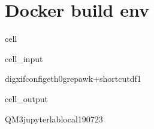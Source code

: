 \documentclass[letterpaper,table,10pt,english]{jupyterBook}
\begin{document}
\section{Docker build env}
\label{\detokenize{tests/build_versions_checks:docker-build-env}}
\begin{sphinxuseclass}{cell}\begin{sphinxVerbatimInput}

\begin{sphinxuseclass}{cell_input}
\begin{sphinxVerbatim}[commandchars=\\\{\}]
dig\PYGZhy{}xifconfigeth0grepawk+shortcut\PYGZhy{}d\PYGZhy{}f1
\end{sphinxVerbatim}

\end{sphinxuseclass}\end{sphinxVerbatimInput}
\begin{sphinxVerbatimOutput}

\begin{sphinxuseclass}{cell_output}
\begin{sphinxVerbatim}[commandchars=\\\{\}]
QM3\PYGZhy{}jupyterlab\PYGZhy{}local\PYGZhy{}190723
\end{sphinxVerbatim}

\end{sphinxuseclass}\end{sphinxVerbatimOutput}

\end{sphinxuseclass}
\end{document}
